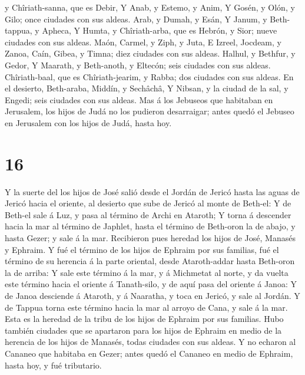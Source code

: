 y Chîriath-sanna, que es Debir,  Y Anab, y Estemo, y
Anim,  Y Gosén, y Olón, y Gilo; once ciudades con sus
aldeas.  Arab, y Dumah, y Esán,  Y Janum,
y Beth-tappua, y Apheca,  Y Humta, y Chîriath-arba, que
es Hebrón, y Sior; nueve ciudades con sus aldeas.  Maón,
Carmel, y Ziph, y Juta,  E Izreel, Jocdeam, y Zanoa,
 Caín, Gibea, y Timna; diez ciudades con sus aldeas.
 Halhul, y Bethfur, y Gedor,  Y Maarath, y
Beth-anoth, y Eltecón; seis ciudades con sus aldeas. 
Chîriath-baal, que es Chîriath-jearim, y Rabba; dos ciudades con sus
aldeas.  En el desierto, Beth-araba, Middín, y Sechâchâ,
 Y Nibsan, y la ciudad de la sal, y Engedi; seis ciudades
con sus aldeas.  Mas á los Jebuseos que habitaban en
Jerusalem, los hijos de Judá no los pudieron desarraigar; antes quedó el
Jebuseo en Jerusalem con los hijos de Judá, hasta hoy.

\hypertarget{section-15}{%
\section{16}\label{section-15}}

 Y la suerte del los hijos de José salió desde el Jordán
de Jericó hasta las aguas de Jericó hacia el oriente, al desierto que
sube de Jericó al monte de Beth-el:  Y de Beth-el sale á
Luz, y pasa al término de Archi en Ataroth;  Y torna á
descender hacia la mar al término de Japhlet, hasta el término de
Beth-oron la de abajo, y hasta Gezer; y sale á la mar. 
Recibieron pues heredad los hijos de José, Manasés y Ephraim.
 Y fué el término de los hijos de Ephraim por sus
familias, fué el término de su herencia á la parte oriental, desde
Ataroth-addar hasta Beth-oron la de arriba:  Y sale este
término á la mar, y á Michmetat al norte, y da vuelta este término hacia
el oriente á Tanath-silo, y de aquí pasa del oriente á Janoa:
 Y de Janoa desciende á Ataroth, y á Naaratha, y toca en
Jericó, y sale al Jordán.  Y de Tappua torna este término
hacia la mar al arroyo de Cana, y sale á la mar. Esta es la heredad de
la tribu de los hijos de Ephraim por sus familias.  Hubo
también ciudades que se apartaron para los hijos de Ephraim en medio de
la herencia de los hijos de Manasés, todas ciudades con sus aldeas.
 Y no echaron al Cananeo que habitaba en Gezer; antes
quedó el Cananeo en medio de Ephraim, hasta hoy, y fué tributario.

